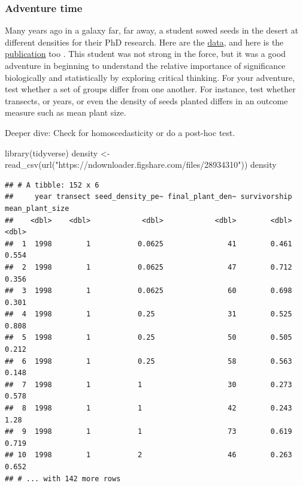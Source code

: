 \documentclass[
]{book}
\newenvironment{Shaded}{\begin{snugshade}}{\end{snugshade}}
\newcommand{\FunctionTok}[1]{\textcolor[rgb]{0.00,0.00,0.00}{#1}}
\newcommand{\NormalTok}[1]{#1}
\newcommand{\OtherTok}[1]{\textcolor[rgb]{0.56,0.35,0.01}{#1}}
\newcommand{\StringTok}[1]{\textcolor[rgb]{0.31,0.60,0.02}{#1}}
\begin{document}
\hypertarget{adventure-time-1}{%
\subsubsection*{Adventure time}\label{adventure-time-1}}

Many years ago in a galaxy far, far away, a student sowed seeds in the desert at different densities for their PhD research. Here are the \href{https://figshare.com/articles/dataset/Density_experiment_in_Negev_Desert_Israel/669703}{data}, and here is the \href{https://besjournals.onlinelibrary.wiley.com/doi/10.1046/j.1365-2745.2002.00686.x}{publication} too \citep{RN3094}. This student was not strong in the force, but it was a good adventure in beginning to understand the relative importance of significance biologically and statistically by exploring critical thinking. For your adventure, test whether a set of groups differ from one another. For instance, test whether transects, or years, or even the density of seeds planted differs in an outcome measure such as mean plant size.

Deeper dive: Check for homoscedasticity or do a post-hoc test.

\begin{Shaded}
\begin{Highlighting}[]
\FunctionTok{library}\NormalTok{(tidyverse)}
\NormalTok{density }\OtherTok{\textless{}{-}} \FunctionTok{read\_csv}\NormalTok{(}\FunctionTok{url}\NormalTok{(}\StringTok{"https://ndownloader.figshare.com/files/28934310"}\NormalTok{))}
\NormalTok{density}
\end{Highlighting}
\end{Shaded}

\begin{verbatim}
## # A tibble: 152 x 6
##     year transect seed_density_pe~ final_plant_den~ survivorship mean_plant_size
##    <dbl>    <dbl>            <dbl>            <dbl>        <dbl>           <dbl>
##  1  1998        1           0.0625               41        0.461           0.554
##  2  1998        1           0.0625               47        0.712           0.356
##  3  1998        1           0.0625               60        0.698           0.301
##  4  1998        1           0.25                 31        0.525           0.808
##  5  1998        1           0.25                 50        0.505           0.212
##  6  1998        1           0.25                 58        0.563           0.148
##  7  1998        1           1                    30        0.273           0.578
##  8  1998        1           1                    42        0.243           1.28 
##  9  1998        1           1                    73        0.619           0.719
## 10  1998        1           2                    46        0.263           0.652
## # ... with 142 more rows
\end{verbatim}
\end{document}
